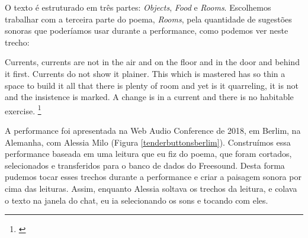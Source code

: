 O texto é estruturado em três partes: \textit{Objects}, \textit{Food} e \textit{Rooms}. Escolhemos trabalhar com a terceira parte do poema, \textit{Rooms}, pela quantidade de sugestões sonoras que poderíamos usar durante a performance, como podemos ver neste trecho:

\begin{citacao}
Currents, currents are not in the air and on the floor and in the door and behind it first. Currents do not show it plainer. This which is mastered has so thin a space to build it all that there is plenty of room and yet is it quarreling, it is not and the insistence is marked. A change is in a current and there is no habitable exercise. \footnote{\cite{Stein1914}}
\end{citacao} 

A performance foi apresentada na Web Audio Conference de 2018, em Berlim, na Alemanha, com Alessia Milo (Figura \ref{tenderbuttonsberlim}). Construímos essa performance baseada em uma leitura que eu fiz do poema, que foram cortados, selecionados e transferidos para o banco de dados do Freesound. Desta forma pudemos tocar esses trechos durante a performance e criar a paisagem sonora por cima das leituras. Assim, enquanto Alessia soltava os trechos da leitura, e colava o texto na janela do chat, eu ia selecionando os sons e tocando com eles. 


